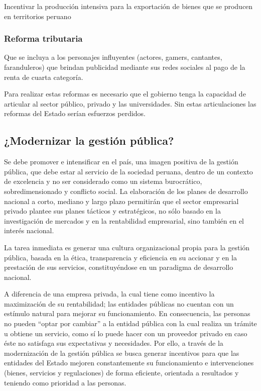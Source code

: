 \documentclass[
  jou,
  floatsintext,
  longtable,
  a4paper,
  nolmodern,
  notxfonts,
  notimes,
  12pt,
  colorlinks=true,linkcolor=blue,citecolor=blue,urlcolor=blue]{apa7}
\begin{document}
Incentivar la producción intensiva para la exportación de bienes que se
producen en territorios peruano

\subsubsection{Reforma tributaria}\label{reforma-tributaria}

Que se incluya a los personajes influyentes (actores, gamers, cantantes,
faranduleros) que brindan publicidad mediante sus redes sociales al pago
de la renta de cuarta categoría.

Para realizar estas reformas es necesario que el gobierno tenga la
capacidad de articular al sector público, privado y las universidades.
Sin estas articulaciones las reformas del Estado serían esfuerzos
perdidos.

\subsection{¿Modernizar la gestión
pública?}\label{modernizar-la-gestiuxf3n-puxfablica}

Se debe promover e intensificar en el país, una imagen positiva de la
gestión pública, que debe estar al servicio de la sociedad peruana,
dentro de un contexto de excelencia y no ser considerado como un sistema
burocrático, sobredimensionado y conflicto social. La elaboración de los
planes de desarrollo nacional a corto, mediano y largo plazo permitirán
que el sector empresarial privado plantee sus planes tácticos y
estratégicos, no sólo basado en la investigación de mercados y en la
rentabilidad empresarial, sino también en el interés nacional.

La tarea inmediata es generar una cultura organizacional propia para la
gestión pública, basada en la ética, transparencia y eficiencia en su
accionar y en la prestación de sus servicios, constituyéndose en un
paradigma de desarrollo nacional.

A diferencia de una empresa privada, la cual tiene como incentivo la
maximización de su rentabilidad; las entidades públicas no cuentan con
un estímulo natural para mejorar su funcionamiento. En consecuencia, las
personas no pueden ``optar por cambiar'' a la entidad pública con la
cual realiza un trámite u obtiene un servicio, como sí lo puede hacer
con un proveedor privado en caso éste no satisfaga sus expectativas y
necesidades. Por ello, a través de la modernización de la gestión
pública se busca generar incentivos para que las entidades del Estado
mejoren constantemente su funcionamiento e intervenciones (bienes,
servicios y regulaciones) de forma eficiente, orientada a resultados y
teniendo como prioridad a las personas.
\end{document}
